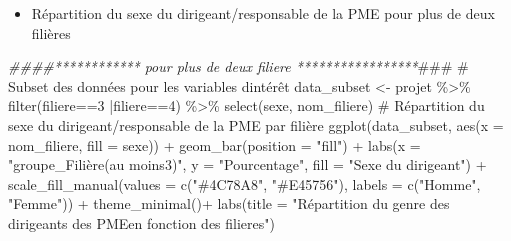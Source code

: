 \documentclass[
  letterpaper,
  DIV=11,
  numbers=noendperiod]{scrartcl}
\newenvironment{Shaded}{\begin{snugshade}}{\end{snugshade}}
\newcommand{\AlertTok}[1]{\textcolor[rgb]{0.68,0.00,0.00}{#1}}
\newcommand{\AttributeTok}[1]{\textcolor[rgb]{0.40,0.45,0.13}{#1}}
\newcommand{\CommentTok}[1]{\textcolor[rgb]{0.37,0.37,0.37}{#1}}
\newcommand{\DecValTok}[1]{\textcolor[rgb]{0.68,0.00,0.00}{#1}}
\newcommand{\DocumentationTok}[1]{\textcolor[rgb]{0.37,0.37,0.37}{\textit{#1}}}
\newcommand{\FunctionTok}[1]{\textcolor[rgb]{0.28,0.35,0.67}{#1}}
\newcommand{\NormalTok}[1]{\textcolor[rgb]{0.00,0.23,0.31}{#1}}
\newcommand{\OtherTok}[1]{\textcolor[rgb]{0.00,0.23,0.31}{#1}}
\newcommand{\SpecialCharTok}[1]{\textcolor[rgb]{0.37,0.37,0.37}{#1}}
\newcommand{\StringTok}[1]{\textcolor[rgb]{0.13,0.47,0.30}{#1}}
\providecommand{\tightlist}{%
  \setlength{\itemsep}{0pt}\setlength{\parskip}{0pt}}\usepackage{longtable,booktabs,array}
\begin{document}
\begin{itemize}
\tightlist
\item
  Répartition du sexe du dirigeant/responsable de la PME pour plus de
  deux filières
\end{itemize}

\begin{Shaded}
\begin{Highlighting}[]
\DocumentationTok{\#\#\#\#************ pour plus de deux filiere *****************}\AlertTok{\#\#\#}
\CommentTok{\# Subset des données pour les variables d\textquotesingle{}intérêt}
\NormalTok{data\_subset }\OtherTok{\textless{}{-}}\NormalTok{ projet }\SpecialCharTok{\%\textgreater{}\%} \FunctionTok{filter}\NormalTok{(filiere}\SpecialCharTok{==}\DecValTok{3} \SpecialCharTok{|}\NormalTok{filiere}\SpecialCharTok{==}\DecValTok{4}\NormalTok{) }\SpecialCharTok{\%\textgreater{}\%} \FunctionTok{select}\NormalTok{(sexe, nom\_filiere)}
\CommentTok{\# Répartition du sexe du dirigeant/responsable de la PME par filière}
\FunctionTok{ggplot}\NormalTok{(data\_subset, }\FunctionTok{aes}\NormalTok{(}\AttributeTok{x =}\NormalTok{ nom\_filiere, }\AttributeTok{fill =}\NormalTok{ sexe)) }\SpecialCharTok{+}
  \FunctionTok{geom\_bar}\NormalTok{(}\AttributeTok{position =} \StringTok{"fill"}\NormalTok{) }\SpecialCharTok{+}
  \FunctionTok{labs}\NormalTok{(}\AttributeTok{x =} \StringTok{"groupe\_Filière(au moins3)"}\NormalTok{, }\AttributeTok{y =} \StringTok{"Pourcentage"}\NormalTok{, }\AttributeTok{fill =} \StringTok{"Sexe du dirigeant"}\NormalTok{) }\SpecialCharTok{+}
  \FunctionTok{scale\_fill\_manual}\NormalTok{(}\AttributeTok{values =} \FunctionTok{c}\NormalTok{(}\StringTok{"\#4C78A8"}\NormalTok{, }\StringTok{"\#E45756"}\NormalTok{), }\AttributeTok{labels =} \FunctionTok{c}\NormalTok{(}\StringTok{"Homme"}\NormalTok{, }\StringTok{"Femme"}\NormalTok{)) }\SpecialCharTok{+}
  \FunctionTok{theme\_minimal}\NormalTok{()}\SpecialCharTok{+} 
  \FunctionTok{labs}\NormalTok{(}\AttributeTok{title =} \StringTok{"Répartition du genre des dirigeants des PMEen fonction des filieres"}\NormalTok{)}
\end{Highlighting}
\end{Shaded}
\end{document}
